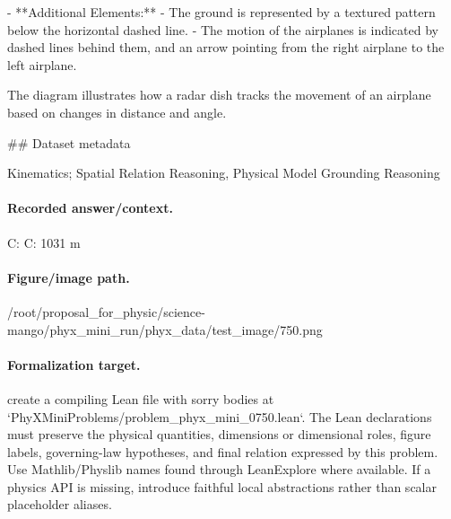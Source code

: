 - **Additional Elements:**
  - The ground is represented by a textured pattern below the horizontal dashed line.
  - The motion of the airplanes is indicated by dashed lines behind them, and an arrow pointing from the right airplane to the left airplane.

The diagram illustrates how a radar dish tracks the movement of an airplane based on changes in distance and angle.

\#\# Dataset metadata

Kinematics; Spatial Relation Reasoning, Physical Model Grounding Reasoning

\paragraph{Recorded answer/context.}
C: C: 1031 m

\paragraph{Figure/image path.}
/root/proposal\_for\_physic/science-mango/phyx\_mini\_run/phyx\_data/test\_image/750.png

\paragraph{Formalization target.}
create a compiling Lean file with sorry bodies at `PhyXMiniProblems/problem\_phyx\_mini\_0750.lean`. The Lean declarations must preserve the physical quantities, dimensions or dimensional roles, figure labels, governing-law hypotheses, and final relation expressed by this problem.
Use Mathlib/Physlib names found through LeanExplore where available. If a physics API is missing, introduce faithful local abstractions rather than scalar placeholder aliases.

